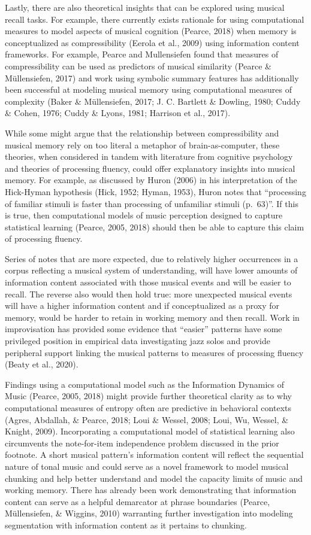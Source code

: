 \documentclass[english,man,floatsintext]{apa6}
\begin{document}
Lastly, there are also theoretical insights that can be explored using musical recall tasks.
For example, there currently exists rationale for using computational measures to model aspects of musical cognition (Pearce, 2018) when memory is conceptualized as compressibility (Eerola et al., 2009) using information content frameworks.
For example, Pearce and Mullensiefen found that measures of compressibility can be used as predictors of musical similarity (Pearce \& Müllensiefen, 2017) and work using symbolic summary features has additionally been successful at modeling musical memory using computational measures of complexity (Baker \& Müllensiefen, 2017; J. C. Bartlett \& Dowling, 1980; Cuddy \& Cohen, 1976; Cuddy \& Lyons, 1981; Harrison et al., 2017).

While some might argue that the relationship between compressibility and musical memory rely on too literal a metaphor of brain-as-computer, these theories, when considered in tandem with literature from cognitive psychology and theories of processing fluency, could offer explanatory insights into musical memory.
For example, as discussed by Huron (2006) in his interpretation of the Hick-Hyman hypothesis (Hick, 1952; Hyman, 1953), Huron notes that \enquote{processing of familiar stimuli is faster than processing of unfamiliar stimuli (p.~63)}.
If this is true, then computational models of music perception designed to capture statistical learning (Pearce, 2005, 2018) should then be able to capture this claim of processing fluency.

Series of notes that are more expected, due to relatively higher occurrences in a corpus reflecting a musical system of understanding, will have lower amounts of information content associated with those musical events and will be easier to recall.
The reverse also would then hold true: more unexpected musical events will have a higher information content and if conceptualized as a proxy for memory, would be harder to retain in working memory and then recall.
Work in improvisation has provided some evidence that \enquote{easier} patterns have some privileged position in empirical data investigating jazz solos and provide peripheral support linking the musical patterns to measures of processing fluency (Beaty et al., 2020).

Findings using a computational model such as the Information Dynamics of Music (Pearce, 2005, 2018) might provide further theoretical clarity as to why computational measures of entropy often are predictive in behavioral contexts (Agres, Abdallah, \& Pearce, 2018; Loui \& Wessel, 2008; Loui, Wu, Wessel, \& Knight, 2009).
Incorporating a computational model of statistical learning also circumvents the note-for-item independence problem discussed in the prior footnote.
A short musical pattern's information content will reflect the sequential nature of tonal music and could serve as a novel framework to model musical chunking and help better understand and model the capacity limits of music and working memory.
There has already been work demonstrating that information content can serve as a helpful demarcator at phrase boundaries (Pearce, Müllensiefen, \& Wiggins, 2010) warranting further investigation into modeling segmentation with information content as it pertains to chunking.
\end{document}
